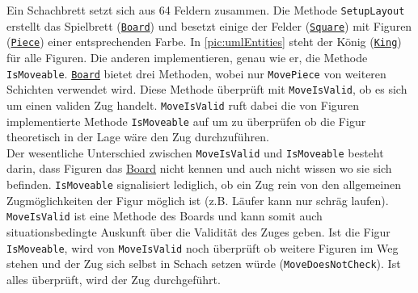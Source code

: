 \documentclass[
10pt, %
a4paper, %
oneside, %
headinclude,footinclude, %
BCOR5mm, %
]{scrartcl}
\begin{document}
\begin{onehalfspace}
Ein Schachbrett setzt sich aus 64 Feldern zusammen. Die Methode \texttt{SetupLayout} erstellt das Spielbrett (\texttt{\href{https://github.com/schmida736/Chess-AdvancedSE/blob/main/Chess-AdvancedSE/Game\%20Elements/Board.cs}{Board}}) und besetzt einige der Felder (\texttt{\href{https://github.com/schmida736/Chess-AdvancedSE/blob/main/Chess-AdvancedSE/Game\%20Elements/Square.cs}{Square}}) mit Figuren (\texttt{\href{https://github.com/schmida736/Chess-AdvancedSE/blob/main/Chess-AdvancedSE/Game\%20Elements/Pieces/Piece.cs}{Piece}}) einer entsprechenden Farbe.
In \autoref{pic:umlEntities} steht der König (\texttt{\href{https://github.com/schmida736/Chess-AdvancedSE/blob/main/Chess-AdvancedSE/Game\%20Elements/Pieces/King.cs}{King}}) für alle Figuren. Die anderen implementieren, genau wie er, die Methode \texttt{IsMoveable}.
\texttt{\href{https://github.com/schmida736/Chess-AdvancedSE/blob/main/Chess-AdvancedSE/Game\%20Elements/Board.cs}{Board}} bietet drei Methoden, wobei nur \texttt{MovePiece} von weiteren Schichten verwendet wird. Diese Methode überprüft mit \texttt{MoveIsValid}, ob es sich um einen validen Zug handelt. \texttt{MoveIsValid} ruft dabei die von Figuren implementierte Methode \texttt{IsMoveable} auf um zu überprüfen ob die Figur theoretisch in der Lage wäre den Zug durchzuführen.\\ 
Der wesentliche Unterschied zwischen \texttt{MoveIsValid} und \texttt{IsMoveable} besteht darin, dass Figuren das \href{https://github.com/schmida736/Chess-AdvancedSE/blob/main/Chess-AdvancedSE/Game\%20Elements/Board.cs}{Board} nicht kennen und auch nicht wissen wo sie sich befinden. \texttt{IsMoveable} signalisiert lediglich, ob ein Zug rein von den allgemeinen Zugmöglichkeiten der Figur möglich ist (z.B. Läufer kann nur schräg laufen). \texttt{MoveIsValid} ist eine Methode des Boards und kann somit auch situationsbedingte Auskunft über die Validität des Zuges geben. Ist die Figur \texttt{IsMoveable}, wird von \texttt{MoveIsValid} noch überprüft ob weitere Figuren im Weg stehen und der Zug sich selbst in Schach setzen würde (\texttt{MoveDoesNotCheck}). Ist alles überprüft, wird der Zug durchgeführt.


\end{onehalfspace}
\end{document}

